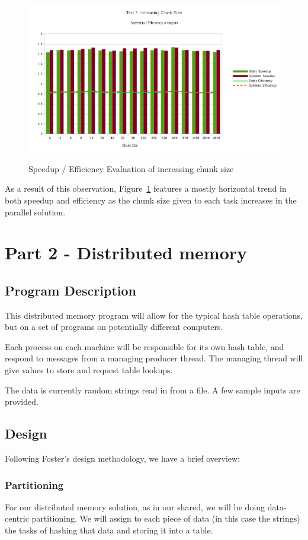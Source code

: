 \documentclass{article}
\begin{document}
\begin{figure}[H]
  \caption{Speedup / Efficiency Evaluation of increasing chunk size}
  \centering
  \includegraphics[width=\textwidth]{chart3b}
    \label{fig:chart3b}
\end{figure}

As a result of this observation, Figure~\ref{fig:chart3b} features a mostly horizontal trend in both speedup and efficiency as the chunk size given to each task increases in the parallel solution. 

\section{Part 2 - Distributed memory}
\subsection{Program Description}
This distributed memory program will allow for the typical hash table operations, but on a set of programs on potentially different computers.

Each process on each machine will be responsible for its own hash table, and respond to messages from a managing producer thread. The managing thread will give values to store and request table lookups.

The data is currently random strings read in from a file. A few sample inputs are provided.

\subsection{Design}
Following Foster's design methodology, we have a brief overview:

\subsubsection{Partitioning}
For our distributed memory solution, as in our shared, we will be doing data-centric partitioning. We will assign to each piece of data (in this case the strings) the tasks of hashing that data and storing it into a table. 
\end{document}
